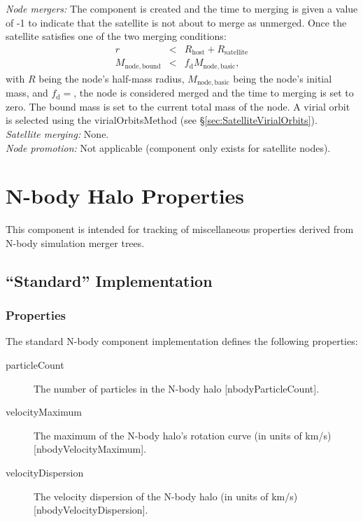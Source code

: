 \noindent\emph{Node mergers:} The \gls{component} is created and the time to merging is given a value of -1 to indicate that the satellite is not about to merge as unmerged.  Once the satellite satisfies one of the two merging conditions:
\begin{eqnarray}
r&<&R_\mathrm{host}+R_\mathrm{satellite}\\
M_\mathrm{node,bound}&<&f_\mathrm{d} M_\mathrm{node,basic},
\end{eqnarray}
with $R$ being the node's half-mass radius, $M_\mathrm{node,basic}$ being the node's initial mass, and $f_\mathrm{d}=${\normalfont \ttfamily [satelliteOrbitingDestructionMassFraction]}, the node is considered merged and the time to merging is set to zero. The bound mass is set to the current total mass of the node. A virial orbit is selected using the {\normalfont \ttfamily virialOrbitsMethod} (see \S\ref{sec:SatelliteVirialOrbits}). \\

\noindent\emph{Satellite merging:} None.\\

\noindent\emph{Node promotion:} Not applicable (component only exists for satellite nodes).\\

\section{N-body Halo Properties}

This component is intended for tracking of miscellaneous properties derived from N-body simulation merger trees.

\subsection{``Standard'' Implementation}

\subsubsection{Properties}

The standard N-body component implementation defines the following properties:
\begin{description}
 \item [{\normalfont \ttfamily particleCount}] The number of particles in the N-body halo [{\normalfont \ttfamily nbodyParticleCount}].
 \item [{\normalfont \ttfamily velocityMaximum}] The maximum of the N-body halo's rotation curve (in units of km/s) [{\normalfont \ttfamily nbodyVelocityMaximum}].
 \item [{\normalfont \ttfamily velocityDispersion}] The velocity dispersion of the N-body halo (in units of km/s) [{\normalfont \ttfamily nbodyVelocityDispersion}].
\end{description}

